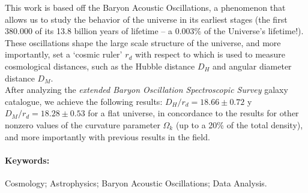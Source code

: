 This work is based off the Baryon Acoustic Oscillations, a phenomenon that allows us to study the behavior of the universe in its earliest stages (the first 380.000 of its 13.8 billion years of lifetime -- a 0.003\% of the Universe's lifetime!). These oscillations shape the large scale structure of the universe, and more importantly, set a `cosmic ruler' $r_d$ with respect to which is used to measure cosmological distances, such as the Hubble distance $D_H$ and angular diameter distance $D_M$.\\

After analyzing the \textit{extended Baryon Oscillation Spectroscopic Survey }galaxy catalogue, we achieve the following results: $D_H/r_d = 18.66\pm 0.72$ y $D_M/r_d = 18.28\pm 0.53$ for a flat universe, in concordance to the results for other nonzero values of the curvature parameter $\Omega_k$ (up to a 20\% of the total density), and more importantly with previous results in the field.





\paragraph{Keywords:} Cosmology; Astrophysics; Baryon Acoustic Oscillations; Data Analysis.
